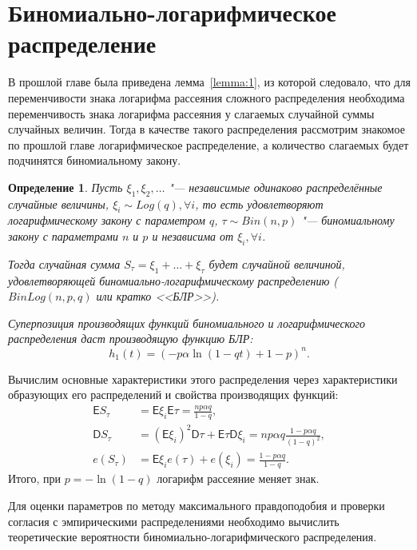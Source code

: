 \documentclass[12pt, specialist, subf, substylefile = spbu.rtx]{disser}
\newtheorem{define}{Определение}
\begin{document}
	\section{Биномиально-логарифмическое распределение}
	
	В прошлой главе была приведена лемма~\ref{lemma:1}, из которой следовало, что для переменчивости знака логарифма рассеяния сложного распределения необходима переменчивость знака логарифма рассеяния у слагаемых случайной суммы случайных величин. Тогда в качестве такого распределения рассмотрим знакомое по прошлой главе логарифмическое распределение, а количество слагаемых будет подчинятся биномиальному закону. 
	
	\begin{define}
		Пусть $\xi _1, \xi _2, \dots$ "--- независимые одинаково распределённые случайные величины, $\xi _i \sim Log(q), \forall i$, то есть удовлетворяют логарифмическому закону с параметром $q$, $\tau \sim Bin(n, p)$ "--- биномиальному закону с параметрами $n$ и $p$ и независима от $\xi _i, \forall i$.
		
		Тогда случайная сумма $S _\tau = \xi _1 + \dots + \xi _\tau$ будет случайной величиной, удовлетворяющей биномиально-логарифмическому распределению ($BinLog(n, p, q)$ или кратко <<БЛР>>).
		
		Суперпозиция производящих функций биномиального и логарифмического распределения даст производящую функцию БЛР:
		\[
			h _1(t) = \left(-p \alpha \ln (1 - qt) + 1 - p\right) ^n.
		\]
		\label{def:BLR}
	\end{define}

	Вычислим основные характеристики этого распределения через характеристики образующих его распределений и свойства производящих функций:
	\[
		\begin{aligned}
			\mathsf{E} S _\tau &= \mathsf{E} \xi _i \mathsf{E} \tau = \frac {n p \alpha q} {1 - q},\\
			\mathsf{D} S _\tau &= \left( \mathsf{E} \xi _i \right) ^2 \mathsf{D} \tau + \mathsf{E} \tau \mathsf{D} \xi _i = n p \alpha q \frac {1 - p \alpha q} {(1 - q) ^2},\\
			e (S _\tau) &= \mathsf{E} \xi _i e (\tau) + e (\xi _i) = \frac {1 - p \alpha q} {1 - q}.
		\end{aligned}
	\]
	Итого, при $ p = - \ln (1 - q) $ логарифм рассеяние меняет знак.
	
	Для оценки параметров по методу максимального правдоподобия и проверки согласия с эмпирическими распределениями необходимо вычислить теоретические вероятности биномиально-логарифмического распределения.
	
\end{document}
